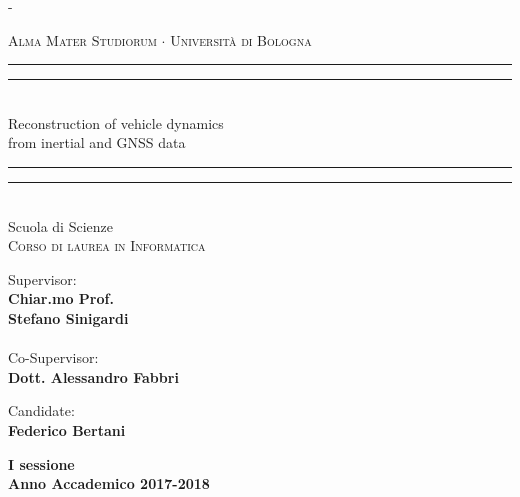 \begin{titlingpage}
\begin{SingleSpace}
\calccentering{\unitlength} 
\begin{adjustwidth*}{\unitlength}{-\unitlength}
\begin{center}
{{\Large{\textsc{Alma Mater Studiorum $\cdot$ Universit\`a di
Bologna}}}}
\end{center}
\begin{center}
\vspace{5mm}
\rule[0.5ex]{\linewidth}{2pt}\vspace*{-\baselineskip}\vspace*{3.2pt}
\rule[0.5ex]{\linewidth}{1pt}\\[\baselineskip]
{\HUGE Reconstruction of vehicle dynamics\\from inertial and GNSS data }\\[4mm]
\rule[0.5ex]{\linewidth}{1pt}\vspace*{-\baselineskip}\vspace{3.2pt}
\rule[0.5ex]{\linewidth}{2pt}\\
\vspace{13mm}
\vspace{11mm}
{\large Scuola di Scienze\\
\textsc{Corso di laurea in Informatica}}\\
\vspace{10mm}
\vfill
\noindent
\begin{minipage}[t]{0.47\textwidth}
{\large Supervisor:\\
\textbf{Chiar.mo Prof.\\
Stefano Sinigardi}\\
\\
Co-Supervisor:\\
\textbf{Dott. Alessandro Fabbri}}
\end{minipage}
\hfill
\begin{minipage}[t]{0.47\textwidth}\raggedleft
{\large Candidate:\\
\textbf{Federico Bertani}}
\end{minipage}
\vspace{20mm}
\end{center}
\begin{center}
{\large{\bf I sessione\\
Anno Accademico 2017-2018 }}
\end{center}
\end{adjustwidth*}
\end{SingleSpace}
\end{titlingpage}
